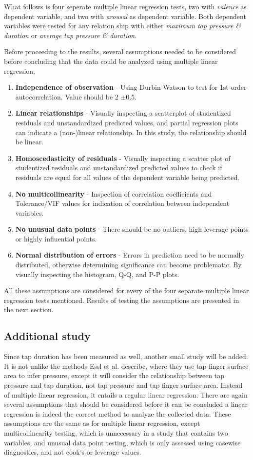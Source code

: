 \documentclass{sigchi}
\begin{document}
What follows is four seperate multiple linear regression tests, two with \textit{valence} as dependent variable, and two with \textit{arousal} as dependent variable. Both dependent variables were tested for any relation ship with either \textit{maximum tap pressure \& duration} or \textit{average tap pressure \& duration}.

Before proceeding to the results, several assumptions needed to be considered before concluding that the data could be analyzed using multiple linear regression;
\begin{enumerate}
  \item \textbf{Independence of observation} - Using Durbin-Watson to test for 1st-order autocorrelation. Value should be 2 $\pm$0.5.
  \item \textbf{Linear relationships} - Visually inspecting a scatterplot of studentized residuals and unstandardized predicted values, and partial regression plots can indicate a (non-)linear relationship. In this study, the relationship should be linear.
  \item \textbf{Homoscedasticity of residuals} - Visually inspecting a scatter plot of studentized residuals and unstandardized predicted values to check if residuals are equal for all values of the dependent variable being predicted.
  \item \textbf{No multicollinearity} - Inspection of correlation coefficients and Tolerance/VIF values for indication of correlation between independent variables.
  \item \textbf{No unusual data points} - There should be no outliers, high leverage points or highly influential points.
  \item \textbf{Normal distribution of errors} - Errors in prediction need to be normally distributed, otherwise determining significance can become problematic. By visually inspecting the histogram, Q-Q, and P-P plots.
\end{enumerate}
All these assumptions are considered for every of the four separate multiple linear regression tests mentioned. Results of testing the assumptions are presented in the next section.


\subsection{Additional study} %
\label{sub:additional_study}
Since tap duration has been measured as well, another small study will be added. It is not unlike the methods Essl et al. \cite{Essl2010} describe, where they use tap finger surface area to infer pressure, except it will consider the relationship between tap pressure and tap duration, not tap pressure and tap finger surface area. Instead of multiple linear regression, it entails a regular linear regression. There are again several assumptions that should be considered before it can be concluded a linear regression is indeed the correct method to analyze the collected data. These assumptions are the same as for multiple linear regression, except multicollinearity testing, which is unnecessary in a study that contains two variables, and unusual data point testing, which is only assessed using casewise diagnostics, and not cook's or leverage values.
\end{document}
